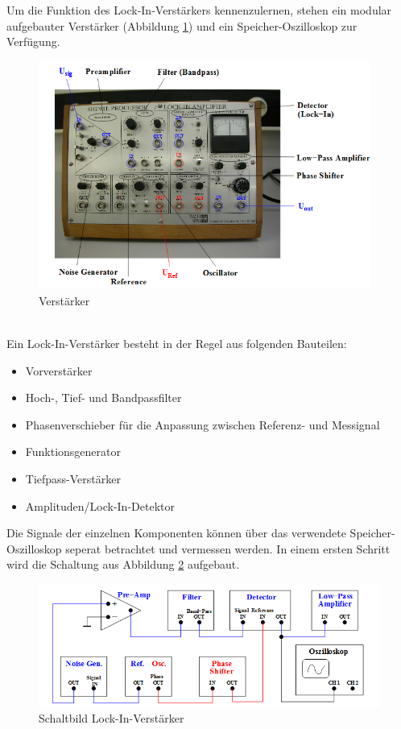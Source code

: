 Um die Funktion des Lock-In-Verstärkers kennenzulernen, stehen ein modular
aufgebauter Verstärker (Abbildung \ref{fig:verstärker}) und ein
Speicher-Oszilloskop zur Verfügung.
\begin{figure}[h]
  \centering
  \includegraphics[height=7.5cm]{Bilder/Verstaerker.jpg}
  \caption{Verstärker \;\cite{303}}
  \label{fig:verstärker}
\end{figure}
\\
Ein Lock-In-Verstärker besteht in der Regel aus folgenden Bauteilen:
\begin{itemize}
  \item Vorverstärker
  \item Hoch-, Tief- und Bandpassfilter
  \item Phasenverschieber für die Anpassung zwischen Referenz- und Messignal
  \item Funktionsgenerator
  \item Tiefpass-Verstärker
  \item Amplituden/Lock-In-Detektor
\end{itemize}
Die Signale der einzelnen Komponenten können über das verwendete
Speicher-Oszilloskop seperat betrachtet und vermessen werden.
\newpage
In einem ersten Schritt wird die Schaltung aus Abbildung \ref{fig:schalt}
aufgebaut.
\begin{figure}[h]
  \centering
  \includegraphics[width=\textwidth]{Bilder/Schaltung.jpg}
  \caption{Schaltbild Lock-In-Verstärker \;\cite{303}}
  \label{fig:schalt}
\end{figure}
